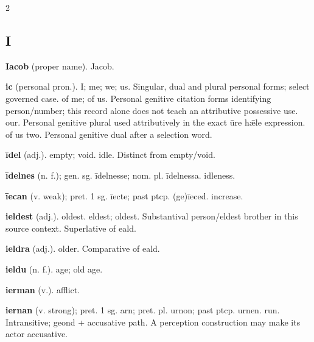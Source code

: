 \begin{multicols*}{2}
\subsection*{I}
\textbf{Iacob} (proper name). Jacob.\par
\textbf{ic} (personal pron.). I; me; we; us. Singular, dual and plural personal forms; select governed case. of me; of us. Personal genitive citation forms identifying person/number; this record alone does not teach an attributive possessive use. our. Personal genitive plural used attributively in the exact ūre hǣle expression. of us two. Personal genitive dual after a selection word.\par
\textbf{īdel} (adj.). empty; void. idle. Distinct from empty/void.\par
\textbf{īdelnes} (n. f.); gen. sg. īdelnesse; nom. pl. īdelnessa. idleness.\par
\textbf{īecan} (v. weak); pret. 1 sg. īecte; past ptcp. (ge)īeced. increase.\par
\textbf{ieldest} (adj.). oldest. eldest; oldest. Substantival person/eldest brother in this source context. Superlative of eald.\par
\textbf{ieldra} (adj.). older. Comparative of eald.\par
\textbf{ieldu} (n. f.). age; old age.\par
\textbf{ierman} (v.). afflict.\par
\textbf{iernan} (v. strong); pret. 1 sg. arn; pret. pl. urnon; past ptcp. urnen. run. Intransitive; geond + accusative path. A perception construction may make its actor accusative.\par

\end{multicols*}
